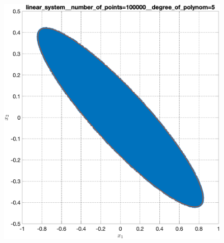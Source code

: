 \documentclass[../main.tex]{subfiles}
\begin{document}
\begin{figure}[ht!]
\begin{minipage}[b]{.3\linewidth}
  	\end{minipage} 
  	\vfill
  	\hspace{-2.5ex}
  	\begin{minipage}[b]{.3\linewidth} 
  		\small
  		\centering 
  		\includegraphics[width=\linewidth]{images/linear_system__number_of_points=100000__degree_of_polynom=5.eps}
  	\end{minipage}
  	\hfill
  	\begin{minipage}[b]{.3\linewidth} 
  		\small
  		\centering

\end{minipage}
\end{figure}
\end{document}
